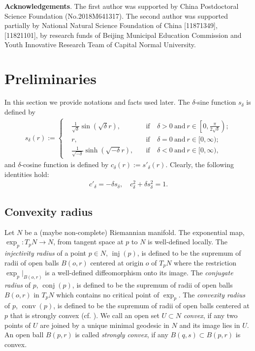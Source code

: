 \documentclass{amsart}
\numberwithin{equation}{section}
\theoremstyle{remark}
\renewcommand{\(}{\left(}
\renewcommand{\)}{\right)}
\renewcommand{\~}{\tilde}
\renewcommand{\-}{\overline}
\renewcommand{\d}{\delta}
\newcommand{\inj}{\operatorname{inj}}
\newcommand{\conj}{\operatorname{conj}}
\newcommand{\conv}{\operatorname{conv}}
\begin{document}
{\bf Acknowledgements}. The first author was supported by China Postdoctoral Science Foundation (No.2018M641317). The second author was supported partially by National Natural Science Foundation of China [11871349], [11821101], by research funds of Beijing Municipal Education Commission and Youth Innovative Research Team of Capital Normal University.



\section{Preliminaries}\label{sec:2}
In this section we provide notations and facts used later. The $\delta$-sine function $s_\d$ is defined by
\begin{equation}\label{2.1}
\begin{split}
s_\d(r):=\left\{ \begin{aligned}
&\frac{1}{\sqrt{\d}}\sin (\sqrt{\d} r), \quad &\text{if}&~\d>0~\text{and}~r\in \left[0,\frac{\pi}{2\sqrt{\d}}\right);\\
&r,                                     \quad &\text{if}&~\d=0~\text{and}~r\in [0,\infty);\\
&\frac{1}{\sqrt{-\d}}\sinh(\sqrt{-\d}r),\quad &\text{if}&~\d<0~\text{and}~r\in [0,\infty),
\end{aligned}
\right.
\end{split}
\end{equation}
and $\delta$-cosine function is defined by $c_\d(r):=s'_\d(r)$.
Clearly, the following identities hold:
\begin{align*}
c'_\d=-\d s_\d, \quad c^2_\d+\d s_\d^2=1.
\end{align*}

\subsection{Convexity radius}\label{sec:2.1}
Let $N$ be a (maybe non-complete) Riemannian manifold. The exponential map, $\exp_p:T_pN\to N$, from tangent space at $p$ to $N$ is well-defined locally. The {\em injectivity radius} of a point $p\in N$, $\inj(p)$, is defined to be the supremum of radii of open balls $B(o,r)$ centered at origin $o$ of $T_pN$ where the restriction $\exp_p|_{B(o,r)}$ is a well-defined diffeomorphism onto its image. The {\em conjugate radius} of $p$, $\conj(p)$, is defined to be the supremum of radii of open balls $B(o,r)$ in $T_pN$ which contains no critical point of $\exp_p$. The {\em convexity radius} of $p$, $\conv(p)$, is defined to be the supremum of radii of open balls centered at $p$ that is strongly convex (cf. \cite{Xu2018}). We call an open set $U\subset N$ {\em convex}, if any two points of $U$ are joined by a unique minimal geodesic in $N$ and its image lies in $U$. An open ball $B(p,r)$ is called {\em strongly convex}, if any $B(q,s)\subset B(p,r)$ is convex.
\end{document}
